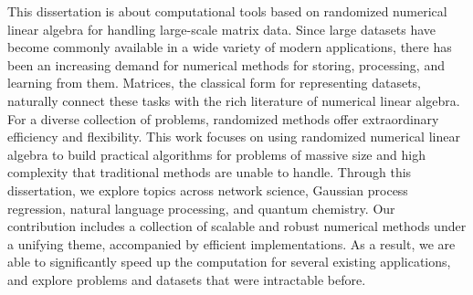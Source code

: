 This dissertation is about computational tools based on randomized numerical
linear algebra for handling large\hyp{}scale matrix data. Since large datasets
have become commonly available in a wide variety of modern applications, there
has been an increasing demand for numerical methods for storing, processing, and
learning from them. Matrices, the classical form for representing datasets,
naturally connect these tasks with the rich literature of numerical linear
algebra. For a diverse collection of problems, randomized methods offer
extraordinary efficiency and flexibility. This work focuses on using randomized
numerical linear algebra to build practical algorithms for problems of massive
size and high complexity that traditional methods are unable to handle. Through
this dissertation, we explore topics across network science, Gaussian process
regression, natural language processing, and quantum chemistry. Our contribution
includes a collection of scalable and robust numerical methods under a unifying
theme, accompanied by efficient implementations. As a result, we are able to
significantly speed up the computation for several existing applications, and
explore problems and datasets that were intractable before.